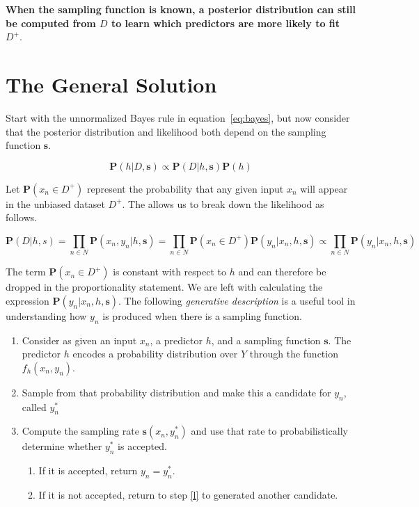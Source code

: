 \documentclass[twoside]{article}
\begin{document}
\textbf{When the sampling function is known, a posterior distribution can still be computed from \(D\) to learn which predictors are more likely to fit \(D^+\)}.

\section{The General Solution}
\label{section:solution}

Start with the unnormalized Bayes rule in equation~\eqref{eq:bayes}, but now consider that the posterior distribution and likelihood both depend on the sampling function \(\mathbf{s}\).

\[\mathbf{P}(h|D,\mathbf{s})\propto\mathbf{P}(D|h,\mathbf{s})\mathbf{P}(h)\]

Let \(\mathbf{P}(x_n \in D^+)\) represent the probability that any given input \(x_n\) will appear in the unbiased dataset \(D^+\). The allows us to break down the likelihood as follows.

\[\mathbf{P}(D|h,s)=\prod_{n \in N} \mathbf{P}(x_n,y_n|h,\mathbf{s})=\prod_{n \in N} \mathbf{P}(x_n \in D^+)\mathbf{P}(y_n|x_n,h,\mathbf{s})\propto\prod_{n \in N}\mathbf{P}(y_n|x_n,h,\mathbf{s})\]

The term \(\mathbf{P}(x_n \in D^+)\) is constant with respect to \(h\) and can therefore be dropped in the proportionality statement. We are left with calculating the expression \(\mathbf{P}(y_n|x_n,h,\mathbf{s})\). The following \textit{generative description} is a useful tool in understanding how \(y_n\) is produced when there is a sampling function.

\begin{enumerate}
	\item Consider as given an input \(x_n\), a predictor \(h\), and a sampling function \(\mathbf{s}\). The predictor \(h\) encodes a probability distribution over \(Y\) through the function \(f_h(x_n,y_n)\).
	\item \label{l} Sample from that probability distribution and make this a candidate for \(y_n\), called \(y_n^*\)
	\item Compute the sampling rate \(\mathbf{s}(x_n,y_n^*)\) and use that rate to probabilistically determine whether \(y_n^*\) is accepted.
    \begin{enumerate}
        \item If it is accepted, return \(y_n=y_n^*\).
        \item If it is not accepted, return to step \ref{l} to generated another candidate.
    \end{enumerate}
\end{enumerate}
\end{document}
